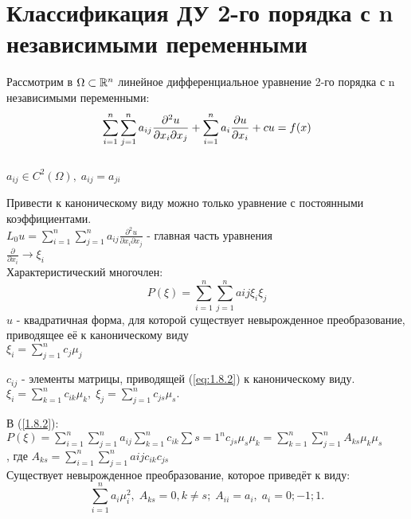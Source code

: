 \documentclass[../main.tex]{subfiles}
\begin{document}
\section{Классификация ДУ 2-го порядка с n независимыми переменными}
\par Рассмотрим в $\Omega \subset \mathbb{R}^n $ линейное дифференциальное уравнение 2-го порядка с n независимыми переменными: \\
\begin{equation}\label{eq:1.8.1}
	\sum_{i=1}^n\sum_{j=1}^n a_{ij}\frac{\partial^2u}{\partial x_i \partial x_j} + \sum_{i=1}^n a_i \frac{\partial u}{\partial x_i} + cu = f(x) \end{equation} \\
$a_{ij} \in C^2(\Omega), \; a_{ij} = a_{ji} $ \\
\par Привести к каноническому виду можно только уравнение с постоянными коэффициентами. \\
$L_0u = \sum_{i=1}^n \sum_{j=1}^n a_{ij} \frac{\partial^2u}{\partial x_i \partial x_j} $ - главная часть уравнения \\
$\frac{\partial}{\partial x_i} \rightarrow \xi_i$ \\
Характеристический многочлен: \\
\begin{equation}\label{eq:1.8.2}
	P(\xi) = \sum_{i=1}^n \sum_{j=1}^n a{ij}\xi_i\xi_j \end{equation} $u$ - квадратичная форма, для которой существует невырожденное преобразование, приводящее её к каноническому виду \\
$\xi_i = \sum_{j=1}^n c_j \mu_j $ \\
\par $c_{ij}$ - элементы матрицы, приводящей (\ref{eq:1.8.2}) к каноническому виду. \\
$\xi_i = \sum_{k=1}^n c_{ik}\mu_k , \; \xi_j = \sum_{j=1}^n c_{js}\mu_s . $ \\
\par В (\ref{1.8.2}): \\
$P(\xi) = \sum_{i=1}^n \sum_{j=1}^n a_{ij} \sum_{k=1}^n c_{ik} \sum{s=1}^n c_{js}\mu_s\mu_k = \sum_{k=1}^n\sum_{j=1}^n A_{ks}\mu_k\mu_s$ \\
, где $A_{ks} = \sum_{i=1}^n\sum_{j=1}^n a{ij}c_{ik}c_{js} $ \\
Существует невырожденное преобразование, которое приведёт к виду:
\begin{equation}\label{eq:1.8.3}
	\sum_{i=1}^n a_i\mu_i^2, \; A_{ks}=0, k \neq s; \; A_{ii} = a_i, \; a_i = 0;-1;1. \end{equation} \\
\end{document}

